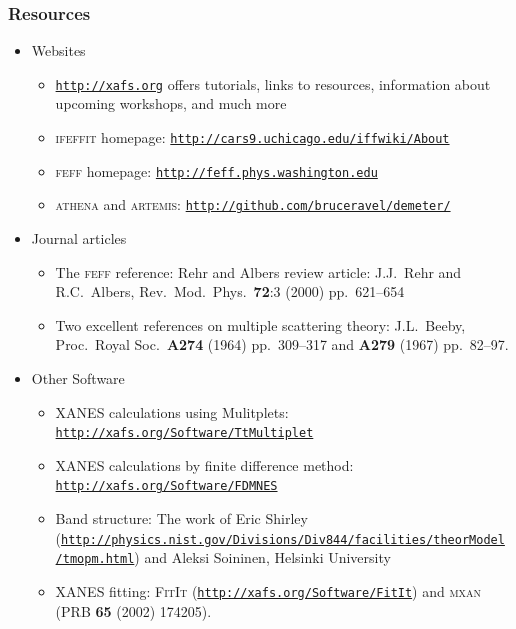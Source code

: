 \documentclass[10pt, xcolor=x11names, compress]{beamer}
\begin{document}
\begin{frame}
  \frametitle{Resources}
  \begin{itemize}
  \item Websites
    \begin{itemize}
    \item \footnotesize
      \href{http://xafs.org}{\color{Blue4}\texttt{http://xafs.org}}
      offers tutorials, links to resources, information about upcoming
      workshops, and much more
    \item \textsc{ifeffit} homepage:
      \href{http://cars9.uchicago.edu/iffwiki/About}
      {\color{Blue4}\texttt{http://cars9.uchicago.edu/iffwiki/About}}
    \item \textsc{feff} homepage:
      \href{http://feff.phys.washington.edu}
      {\color{Blue4}\texttt{http://feff.phys.washington.edu}}
    \item \textsc{athena} and \textsc{artemis}:
      \href{http://github.com/bruceravel/demeter}
      {\color{Blue4}\texttt{http://github.com/bruceravel/demeter/}}
    \end{itemize}
  \item Journal articles
    \begin{itemize}
    \item \footnotesize The \textsc{feff} reference: Rehr and Albers review article:   J.J.~Rehr and R.C.~Albers,
      Rev.\ Mod.\ Phys.\ \textbf{72}:3 (2000) pp.\ 621--654
    \item Two excellent references on multiple scattering theory:
      J.L.~Beeby, Proc.\ Royal Soc.\ \textbf{A274} (1964) pp.\
      309--317 and \textbf{A279} (1967) pp.\ 82--97.
    \end{itemize}
  \item Other Software
    \begin{itemize}
    \item \footnotesize XANES calculations using Mulitplets:
      \href{http://xafs.org/Software/TtMultiplet}
      {\color{Blue4}\texttt{http://xafs.org/Software/TtMultiplet}}
    \item XANES calculations by finite difference method:
      \href{http://xafs.org/Software/FDMNES}
      {\color{Blue4}\texttt{http://xafs.org/Software/FDMNES}}
    \item Band structure: The work of Eric Shirley
      (\href{http://physics.nist.gov/Divisions/Div844/facilities/theorModel/tmopm.html}
      {\color{Blue4}\tiny \texttt{http://physics.nist.gov/Divisions/Div844/facilities/theorModel/tmopm.html}}) and
      Aleksi Soininen, Helsinki University
    \item XANES fitting: \textsc{FitIt} (\href{http://xafs.org/Software/FitIt}{\color{Blue4}\texttt{http://xafs.org/Software/FitIt}})
      and \textsc{mxan} (PRB \textbf{65} (2002) 174205).
    \end{itemize}
  \end{itemize}
\end{frame}
\end{document}
